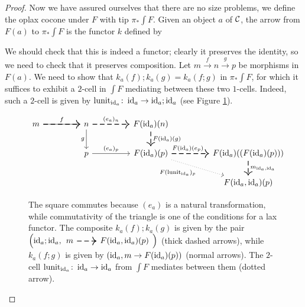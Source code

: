 \begin{proof}
  Now we have assured ourselves that there are no size problems, we define the oplax cocone under $F$ with tip $\pi_*\int F$.
  Given an object $a$ of ${\mathcal{C}}$, the arrow from $F(a)$ to $\pi_*\int F$ is the functor $k$ defined by
  We should check that this is indeed a functor; clearly it preserves the identity, so we need to check that it preserves composition.  
  Let $m\xrightarrow{f}n\xrightarrow{g}p$ be morphisms in $F(a)$.  
  We need to show that $k_a(f);k_a(g) = k_a(f;g)$ in $\pi_*\int F$, for which it suffices to exhibit a $2$-cell in $\int F$ mediating between these two $1$-cells.  
  Indeed, such a $2$-cell is given by $\operatorname{lunit}_{\operatorname{id}_a}\colon \operatorname{id}_a \to \operatorname{id}_a;\operatorname{id}_a$ (see Figure \ref{FigKaFG=KaFKaG}).
  \begin{figure}
    \[
      \begin{tikzcd}[column sep=45pt]
        m \arrow[r, thick, dashed, "f"] \arrow[r]
          & n \arrow[r, thick, dashed, "(e_a)_n"] \arrow[d, "g"']
            & F(\id_a)(n) \arrow[d, thick, dashed, "F(\id_a)(g)"]
              & \\
          & p \arrow[r, "(e_a)_p"]
            & F(\id_a)(p) \arrow[r, thick, dashed, "F(\id_a)(e_p)" xshift=-3pt] \arrow[dr, dotted, "F(\lunit_{\id_a})_p"']
              & F(\id_a)((F(\id_a)(p))) \arrow[d, thick, dashed, "{m_{\id_a,\id_a}}"] \\
          &
            &
              & F(\id_a,\id_a)(p)
      \end{tikzcd}
      \]
    \caption[The composite $k_a(f);k_a(g)$ is equal to $k_a(f;g)$ in $\pi_*\int F$.]{The square commutes because $(e_a)$ is a natural transformation, while commutativity of the triangle is one of the conditions for a lax functor.  
The composite $k_a(f);k_a(g)$ is given by the pair $\left(\id_a;\id_a, {\begin{tikzcd}[ampersand replacement=\&]m \arrow[r, thick, dashed] \& F(\id_a,\id_a)(p)\end{tikzcd}}\right)$ (thick dashed arrows), while $k_a(f;g)$ is given by $\left(\operatorname{id}_a,m \to F(\operatorname{id}_a)(p)\right)$ (normal arrows). The $2$-cell $\operatorname{lunit}_{\operatorname{id}_a}\colon \operatorname{id}_a\to\operatorname{id}_a$ from $\int F$ mediates between them (dotted arrow).}
      \label{FigKaFG=KaFKaG}
  \end{figure}


\end{proof}
